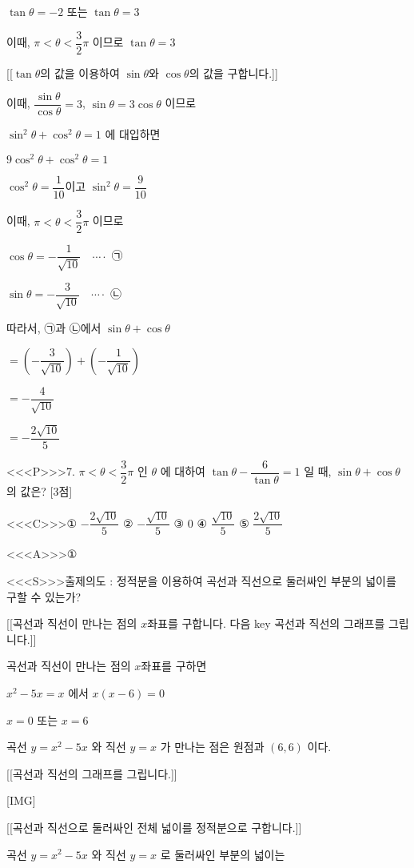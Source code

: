 \documentclass{oblivoir}
\begin{document}
$\tan \theta=-2$ 또는 $\tan \theta=3$

이때, $\pi<  \theta<  \dfrac{3}{2} \pi$ 이므로
$\tan \theta=3$

[[$\tan \theta$의 값을 이용하여 $\sin \theta$와 $\cos \theta$의 값을 구합니다.]]

이때,
$\dfrac{\sin \theta}{\cos \theta}=3$,
$\sin \theta=3 \cos \theta$
이므로

$\sin ^{2} \theta+\cos ^{2} \theta=1$ 에 대입하면

$9 \cos ^{2} \theta+\cos ^{2} \theta=1$

$ \cos ^{2} \theta=\dfrac{1}{10}$이고 $ \sin ^{2} \theta=\dfrac{9}{10}$

이때, $\pi<  \theta<  \dfrac{3}{2} \pi$ 이므로

$\cos \theta=-\dfrac{1}{\sqrt{10}} \quad \cdots \cdot$ ㉠

$\sin \theta=-\dfrac{3}{\sqrt{10}} \quad \cdots \cdot$ ㉡

따라서, ㉠과 ㉡에서 $\sin \theta+\cos \theta$

$=\left(-\dfrac{3}{\sqrt{10}}\right)+\left(-\dfrac{1}{\sqrt{10}}\right)$

$=-\dfrac{4}{\sqrt{10}}$

$=-\dfrac{2 \sqrt{10}}{5}$



<<<P>>>7. $\pi<  \theta<  \dfrac{3}{2} \pi$ 인 $\theta$ 에 대하여 $\tan \theta-\dfrac{6}{\tan \theta}=1$ 일 때, $\sin \theta+\cos \theta$ 의 값은? [3점]

<<<C>>>① $-\dfrac{2 \sqrt{10}}{5}$
② $-\dfrac{\sqrt{10}}{5}$
③ $0$
④ $\dfrac{\sqrt{10}}{5}$
⑤ $\dfrac{2 \sqrt{10}}{5}$


<<<A>>>①

<<<S>>>출제의도 : 정적분을 이용하여 곡선과 직선으로 둘러싸인 부분의 넓이를 구할 수 있는가?

[[곡선과 직선이 만나는 점의 $x$좌표를 구합니다. 다음 key 곡선과 직선의 그래프를 그립니다.]]

곡선과 직선이 만나는 점의 $x$좌표를 구하면 

$x^{2}-5 x=x$ 에서 $x(x-6)=0$

$x=0$ 또는 $x=6$

곡선 $y=x^{2}-5 x$ 와 직선 $y=x$ 가 만나는 점은 원점과 $(6,6)$ 이다.

[[곡선과 직선의 그래프를 그립니다.]]

[IMG]

[[곡선과 직선으로 둘러싸인 전체 넓이를 정적분으로 구합니다.]]

곡선 $y=x^{2}-5 x$ 와 직선 $y=x$ 로 둘러싸인 부분의 넓이는
\end{document}
